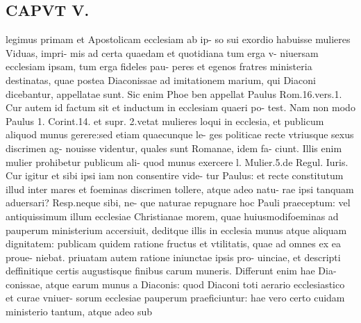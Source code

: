 \documentclass{article}
\begin{document}
\begin{pages}
\section*{CAPVT V. }
\marginpar{[ p.271 ]}\pstart legimus primam et Apostolicam ecclesiam ab ip- so sui exordio habuisse mulieres Viduas, impri- mis ad certa quaedam et quotidiana tum erga v- niuersam ecclesiam ipsam, tum erga fideles pau- peres et egenos fratres ministeria destinatas, quae postea Diaconissae ad imitationem marium, qui Diaconi dicebantur, appellatae sunt. Sic enim Phoe ben appellat Paulus Rom.16.vers.1. Cur autem id factum sit et inductum in ecclesiam quaeri po- test. Nam non modo Paulus 1. Corint.14. et supr. 2.vetat mulieres loqui in ecclesia, et publicum aliquod munus gerere:sed etiam quaecunque le- ges politicae recte vtriusque sexus discrimen ag- nouisse videntur, quales sunt Romanae, idem fa- ciunt. Illis enim mulier prohibetur publicum ali- quod munus exercere l. Mulier.5.de Regul. Iuris. Cur igitur et sibi ipsi iam non consentire vide- tur Paulus: et recte constitutum illud inter mares et foeminas discrimen tollere, atque adeo natu- rae ipsi tanquam aduersari? Resp.neque sibi, ne- que naturae repugnare hoc Pauli praeceptum: vel antiquissimum illum ecclesiae Christianae morem, quae huiusmodifoeminas ad pauperum ministerium accersiuit, deditque illis in ecclesia munus atque aliquam dignitatem: publicam quidem ratione fructus et vtilitatis, quae ad omnes ex ea proue- niebat. priuatam autem ratione iniunctae ipsis pro- uinciae, et descripti deffinitique certis augustisque finibus carum muneris. Differunt enim hae Dia- conissae, atque earum munus a Diaconis: quod Diaconi toti aerario ecclesiastico et curae vniuer- sorum ecclesiae pauperum praeficiuntur: hae vero certo cuidam ministerio tantum, atque adeo sub  \pend

\end{pages}
\end{document}
